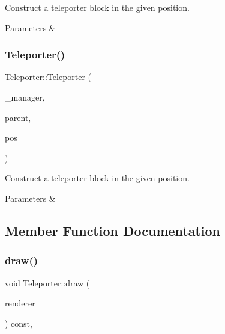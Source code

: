 Construct a teleporter block in the given position. 


\begin{DoxyParams}{Parameters}
{\em } & \\
\hline
\end{DoxyParams}
\mbox{\label{class_teleporter_a153adbdf3cefa34334eb41aea2bb7176}} 
\subsubsection{\texorpdfstring{Teleporter()}{Teleporter()}\hspace{0.1cm}{\footnotesize\ttfamily [3/3]}}
{\footnotesize\ttfamily Teleporter\+::\+Teleporter (\begin{DoxyParamCaption}\item[{\mbox{\hyperlink{class_game_manager}{Game\+Manager}} $\ast$}]{\+\_\+manager,  }\item[{\mbox{\hyperlink{class_game_entity}{Game\+Entity}} $\ast$}]{parent,  }\item[{\mbox{\hyperlink{classsf_1_1_vector2}{sf\+::\+Vector2f}}}]{pos }\end{DoxyParamCaption})}



Construct a teleporter block in the given position. 


\begin{DoxyParams}{Parameters}
{\em } & \\
\hline
\end{DoxyParams}


\subsection{Member Function Documentation}
\mbox{\label{class_teleporter_a621bb8c380bf14910c18753ed7c25750}} 
\subsubsection{\texorpdfstring{draw()}{draw()}}
{\footnotesize\ttfamily void Teleporter\+::draw (\begin{DoxyParamCaption}\item[{\mbox{\hyperlink{classsf_1_1_render_target}{sf\+::\+Render\+Target}} \&}]{renderer }\end{DoxyParamCaption}) const\hspace{0.3cm}{\ttfamily [override]}, {\ttfamily [virtual]}}



